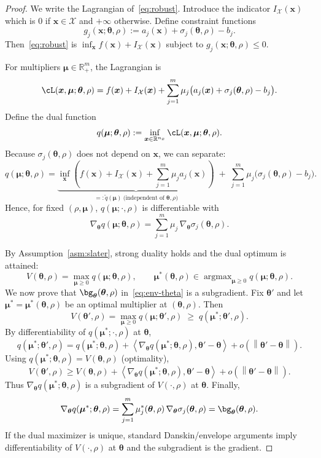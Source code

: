 \documentclass[11pt]{article}
\newcommand{\R}{\mathbb{R}}
\newcommand{\cX}{\mathcal{X}}
\newcommand{\ip}[2]{\left\langle #1, #2 \right\rangle}
\newcommand{\norm}[1]{\left\|#1\right\|}
\newcommand{\btheta}{\bm{\theta}}
\newcommand{\bx}{\bm{x}}
\newcommand{\bmu}{\bm{\mu}}
\DeclareMathOperator{\argmax}{argmax}
\theoremstyle{plain}
\theoremstyle{definition}
\begin{document}
\begin{proof}
We write the Lagrangian of~\eqref{eq:robust}. Introduce the indicator $I_{\cX}(\bx)$ which is $0$ if $\bx\in\cX$ and $+\infty$ otherwise.
Define constraint functions
\[
g_j(\bx;\btheta,\rho) := a_j(\bx) + \sigma_j(\btheta,\rho) - b_j.
\]
Then~\eqref{eq:robust} is $\inf_{\bx} f(\bx)+I_{\cX}(\bx)$ subject to $g_j(\bx;\btheta,\rho)\le 0$.

For multipliers $\bmu\in \R_+^m$, the Lagrangian is
\[
\cL(\bx,\bmu;\btheta,\rho)
=
f(\bx)+I_{\cX}(\bx)+\sum_{j=1}^m \mu_j\big(a_j(\bx)+\sigma_j(\btheta,\rho)-b_j\big).
\]
Define the dual function
\[
q(\bmu;\btheta,\rho) := \inf_{\bx\in \R^{n_x}} \cL(\bx,\bmu;\btheta,\rho).
\]
Because $\sigma_j(\btheta,\rho)$ does not depend on $\bx$, we can separate:
\[
q(\bmu;\btheta,\rho)
=
\underbrace{\inf_{\bx}\left(f(\bx)+I_{\cX}(\bx)+\sum_{j=1}^m \mu_j a_j(\bx)\right)}_{=: \tilde q(\bmu)\ \text{(independent of $\btheta,\rho$)}}
\;+\;
\sum_{j=1}^m \mu_j\big(\sigma_j(\btheta,\rho)-b_j\big).
\]
Hence, for fixed $(\rho,\bmu)$, $q(\bmu;\cdot,\rho)$ is differentiable with
\[
\nabla_{\btheta} q(\bmu;\btheta,\rho) = \sum_{j=1}^m \mu_j\,\nabla_{\btheta}\sigma_j(\btheta,\rho).
\]

By Assumption~\ref{asm:slater}, strong duality holds and the dual optimum is attained:
\[
V(\btheta,\rho) = \max_{\bmu\ge 0} q(\bmu;\btheta,\rho),
\qquad
\bmu^*(\btheta,\rho)\in \argmax_{\bmu\ge 0} q(\bmu;\btheta,\rho).
\]
We now prove that $\bg_{\btheta}(\btheta,\rho)$ in~\eqref{eq:env-theta} is a subgradient.
Fix $\btheta'$ and let $\bmu^*=\bmu^*(\btheta,\rho)$ be an optimal multiplier at $(\btheta,\rho)$.
Then
\[
V(\btheta',\rho) = \max_{\bmu\ge 0} q(\bmu;\btheta',\rho) \;\ge\; q(\bmu^*;\btheta',\rho).
\]
By differentiability of $q(\bmu^*;\cdot,\rho)$ at $\btheta$,
\[
q(\bmu^*;\btheta',\rho)
=
q(\bmu^*;\btheta,\rho)
+
\ip{\nabla_{\btheta}q(\bmu^*;\btheta,\rho)}{\btheta'-\btheta}
+o(\norm{\btheta'-\btheta}).
\]
Using $q(\bmu^*;\btheta,\rho)=V(\btheta,\rho)$ (optimality),
\[
V(\btheta',\rho)\ge V(\btheta,\rho) + \ip{\nabla_{\btheta}q(\bmu^*;\btheta,\rho)}{\btheta'-\btheta} + o(\norm{\btheta'-\btheta}).
\]
Thus $\nabla_{\btheta}q(\bmu^*;\btheta,\rho)$ is a subgradient of $V(\cdot,\rho)$ at $\btheta$.
Finally,
\[
\nabla_{\btheta}q(\bmu^*;\btheta,\rho)=\sum_{j=1}^m \mu_j^*(\btheta,\rho)\,\nabla_{\btheta}\sigma_j(\btheta,\rho)=\bg_{\btheta}(\btheta,\rho).
\]
If the dual maximizer is unique, standard Danskin/envelope arguments imply differentiability of $V(\cdot,\rho)$ at $\btheta$ and the subgradient is the gradient.
\end{proof}
\end{document}
